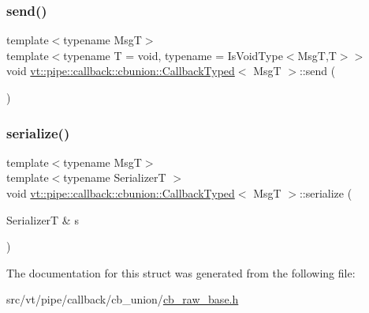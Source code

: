 \mbox{\label{structvt_1_1pipe_1_1callback_1_1cbunion_1_1_callback_typed_aa118972d857f12ec7433e01440b2dfd3}} 
\subsubsection{\texorpdfstring{send()}{send()}\hspace{0.1cm}{\footnotesize\ttfamily [2/2]}}
{\footnotesize\ttfamily template$<$typename MsgT$>$ \\
template$<$typename T  = void, typename  = Is\+Void\+Type$<$\+Msg\+T,\+T$>$$>$ \\
void \hyperlink{structvt_1_1pipe_1_1callback_1_1cbunion_1_1_callback_typed}{vt\+::pipe\+::callback\+::cbunion\+::\+Callback\+Typed}$<$ MsgT $>$\+::send (\begin{DoxyParamCaption}{ }\end{DoxyParamCaption})\hspace{0.3cm}{\ttfamily [inline]}}

\mbox{\label{structvt_1_1pipe_1_1callback_1_1cbunion_1_1_callback_typed_adf664b7850b5c89afd0abdac51bba0ed}} 
\subsubsection{\texorpdfstring{serialize()}{serialize()}}
{\footnotesize\ttfamily template$<$typename MsgT$>$ \\
template$<$typename SerializerT $>$ \\
void \hyperlink{structvt_1_1pipe_1_1callback_1_1cbunion_1_1_callback_typed}{vt\+::pipe\+::callback\+::cbunion\+::\+Callback\+Typed}$<$ MsgT $>$\+::serialize (\begin{DoxyParamCaption}\item[{SerializerT \&}]{s }\end{DoxyParamCaption})\hspace{0.3cm}{\ttfamily [inline]}}



The documentation for this struct was generated from the following file\+:\begin{DoxyCompactItemize}
\item 
src/vt/pipe/callback/cb\+\_\+union/\hyperlink{cb__raw__base_8h}{cb\+\_\+raw\+\_\+base.\+h}\end{DoxyCompactItemize}
